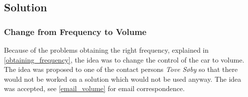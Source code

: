 \subsection{Solution}
\subsubsection{Change from Frequency to Volume}
Because of the problems obtaining the right frequency, explained in \cref{obtaining_frequency}, the idea was to change the control of the car to volume.
The idea was proposed to one of the contact persons \textit{Tove Søby} so that there would not be worked on a solution which would not be used anyway.
The idea was accepted, see \cref{email_volume} for email correspondence.